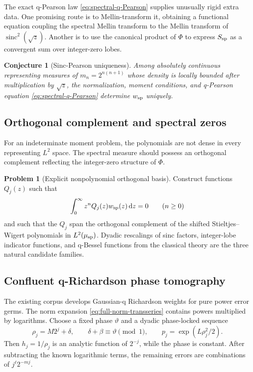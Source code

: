 \documentclass[11pt,oneside]{article}
\numberwithin{equation}{section}
\theoremstyle{plain}
\newtheorem{conjecture}[theorem]{Conjecture}
\theoremstyle{definition}
\newtheorem{problem}[theorem]{Problem}
\theoremstyle{remark}
\newcommand{\sinc}{\operatorname{sinc}}
\newcommand{\dd}{\,\mathrm d}
\begin{document}
The exact q-Pearson law \eqref{eq:spectral-q-Pearson} supplies unusually rigid extra data.
One promising route is to Mellin-transform it, obtaining a functional equation coupling the
spectral Mellin transform to the Mellin transform of $\sinc^2(\sqrt z)$.  Another is to use
the canonical product of $\Phi$ to express $S_{\rm sp}$ as a convergent sum over integer-zero
lobes.

\begin{conjecture}[Sinc-Pearson uniqueness]
\label{conj:sinc-Pearson-uniqueness}
Among absolutely continuous representing measures of
$m_n=2^{n(n+1)}$ whose density is locally bounded after multiplication by $\sqrt z$, the
normalization, moment conditions, and q-Pearson equation
\eqref{eq:spectral-q-Pearson} determine $w_{\rm sp}$ uniquely.
\end{conjecture}

\subsection{Orthogonal complement and spectral zeros}

For an indeterminate moment problem, the polynomials are not dense in every representing
$L^2$ space.  The spectral measure should possess an orthogonal complement reflecting the
integer-zero structure of $\Phi$.

\begin{problem}[Explicit nonpolynomial orthogonal basis]
Construct functions $Q_j(z)$ such that
\[
 \int_0^\infty z^nQ_j(z)w_{\rm sp}(z)\dd z=0
 \qquad(n\geq0)
\]
and such that the $Q_j$ span the orthogonal complement of the shifted
Stieltjes--Wigert polynomials in $L^2(\mu_{\rm sp})$.  Dyadic rescalings of sinc factors,
integer-lobe indicator functions, and q-Bessel functions from the classical theory are the
three natural candidate families.
\end{problem}

\subsection{Confluent q-Richardson phase tomography}

The existing corpus develops Gaussian-q Richardson weights for pure power error germs.
The norm expansion \eqref{eq:full-norm-transseries} contains powers multiplied by logarithms.
Choose a fixed phase $\vartheta$ and a dyadic phase-locked sequence
\begin{equation}
 \rho_j=M2^j+\delta,
 \qquad
 \delta+\beta\equiv\vartheta\pmod1,
 \qquad
 p_j=\exp(L\rho_j^2/2).
 \label{eq:dyadic-phase-nodes}
\end{equation}
Then $h_j=1/\rho_j$ is an analytic function of $2^{-j}$, while the phase is constant.
After subtracting the known logarithmic terms, the remaining errors are combinations of
$j^\ell2^{-mj}$.
\end{document}
